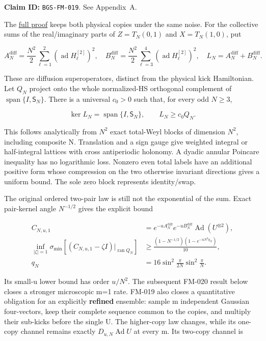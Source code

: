 \textbf{Claim ID:} \texttt{BGS-FM-019}. See Appendix~A.

\begin{theorem}\label{pass2:frontier-fm-019}

The
\href{https://github.com/ChurilovMaksim/BGS/blob/main/mathematics/collective_diffusion_gap.md}{full proof} keeps both physical copies under
the same noise. For the collective sums of the real/imaginary parts
of \(Z=T_N(0,1)\) and \(X=T_N(1,0)\), put

\[
A_N^{\mathrm{diff}}=\frac{N^2}{2}\sum_{\ell=1}^2
 (\operatorname{ad}H_\ell^{[2]})^2,\quad
B_N^{\mathrm{diff}}=\frac{N^2}{2}\sum_{\ell=3}^4
 (\operatorname{ad}H_\ell^{[2]})^2,\quad
L_N=A_N^{\mathrm{diff}}+B_N^{\mathrm{diff}}.
\]

These are diffusion superoperators, distinct from the physical kick
Hamiltonian. Let \(Q_N\) project onto the whole normalized-HS orthogonal
complement of \(\operatorname{span}\{I,\mathsf S_N\}\). There is a
universal \(c_0>0\) such that, for every odd \(N\ge3\),

\[
\ker L_N=\operatorname{span}\{I,\mathsf S_N\},\qquad
L_N\ge c_0Q_N.
\]

\end{theorem}

This follows analytically from \(N^2\) exact total-Weyl blocks of dimension
\(N^2\), including composite N. Translation and a sign gauge give weighted
integral or half-integral lattices with cross antiperiodic holonomy.
A dyadic annular Poincare inequality has no logarithmic loss. Nonzero
even total labels have an additional positive form whose compression
on the two otherwise invariant directions gives a uniform bound.
The sole zero block represents identity/swap.

The original ordered two-pair law is still not the exponential of the
sum. Exact pair-kernel angle \(N^{-1/2}\) gives the explicit bound

\[
\begin{aligned}
C_{N,u,1}&=e^{-uA_N^{\mathrm{diff}}}e^{-uB_N^{\mathrm{diff}}}
       \operatorname{Ad}(U^{\otimes2}),\\
\inf_{|\zeta|=1}\sigma_{\min}
 [(C_{N,u,1}-\zeta I)|_{\operatorname{ran}Q_N}]
&\ge\frac{(1-N^{-1/2})(1-e^{-uN^2q_N})}{10},\\
q_N&=16\sin^2\frac{\pi}{2N}\sin^2\frac{\pi}{N}.
\end{aligned}
\]

Its small-u lower bound has order \(u/N^2\). The subsequent FM-020 result below
closes a stronger microscopic m=1 rate. FM-019 also closes a quantitative
obligation for an explicitly \textbf{refined} ensemble:
sample m independent Gaussian four-vectors, keep their complete sequence
common to the copies, and multiply their sub-kicks before the single U.
The higher-copy law changes, while its one-copy channel remains exactly
\(D_{u,N}\operatorname{Ad}U\) at every m. Its two-copy channel is

